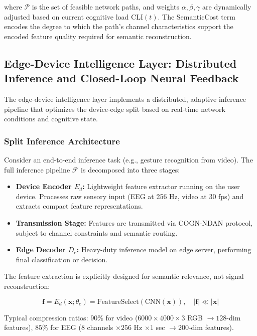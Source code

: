 \documentclass{BVP_CINC}
\newcommand{\COGN}{COGN-NDAN}
\begin{document}
where $\mathcal{P}$ is the set of feasible network paths, and weights $\alpha, \beta, \gamma$ are dynamically adjusted based on current cognitive load $\text{CLI}(t)$. The SemanticCost term encodes the degree to which the path's channel characteristics support the encoded feature quality required for semantic reconstruction.

\subsection{Edge-Device Intelligence Layer: Distributed Inference and Closed-Loop Neural Feedback}

The edge-device intelligence layer implements a distributed, adaptive inference pipeline that optimizes the device-edge split based on real-time network conditions and cognitive state.

\subsubsection{Split Inference Architecture}
Consider an end-to-end inference task (e.g., gesture recognition from video). The full inference pipeline $\mathcal{F}$ is decomposed into three stages:
\begin{itemize}
    \item \textbf{Device Encoder $E_d$:} Lightweight feature extractor running on the user device. Processes raw sensory input (EEG at 256 Hz, video at 30 fps) and extracts compact feature representations.
    \item \textbf{Transmission Stage:} Features are transmitted via \COGN{} protocol, subject to channel constraints and semantic routing.
    \item \textbf{Edge Decoder $D_e$:} Heavy-duty inference model on edge server, performing final classification or decision.
\end{itemize}

The feature extraction is explicitly designed for semantic relevance, not signal reconstruction:

\begin{equation}
    \mathbf{f} = E_d(\mathbf{x}; \theta_e) = \text{FeatureSelect}(\text{CNN}(\mathbf{x})), \quad |\mathbf{f}| \ll |\mathbf{x}|
\end{equation}

Typical compression ratios: $90\%$ for video ($6000 \times 4000 \times 3$ RGB $\to 128$-dim features), $85\%$ for EEG ($8$ channels $\times 256$ Hz $\times 1$ sec $\to 200$-dim features).
\end{document}
